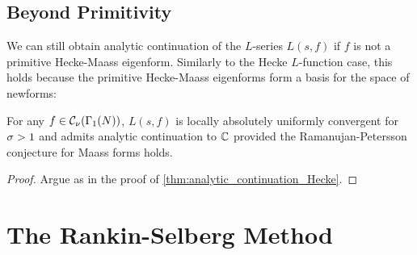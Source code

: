     \subsection*{Beyond Primitivity}
      We can still obtain analytic continuation of the $L$-series $L(s,f)$ if $f$ is not a primitive Hecke-Maass eigenform. Similarly to the Hecke $L$-function case, this holds because the primitive Hecke-Maass eigenforms form a basis for the space of newforms:

      \begin{theorem}\label{thm:analytic_continuation_Hecke-Maass}
        For any $f \in \mathcal{C}_{\nu}(\Gamma_{1}(N))$, $L(s,f)$ is locally absolutely uniformly convergent for $\sigma > 1$ and admits analytic continuation to $\mathbb{C}$ provided the Ramanujan-Petersson conjecture for Maass forms holds.
      \end{theorem}
      \begin{proof}
        Argue as in the proof of \cref{thm:analytic_continuation_Hecke}.
      \end{proof}
  \section{The Rankin-Selberg Method}
